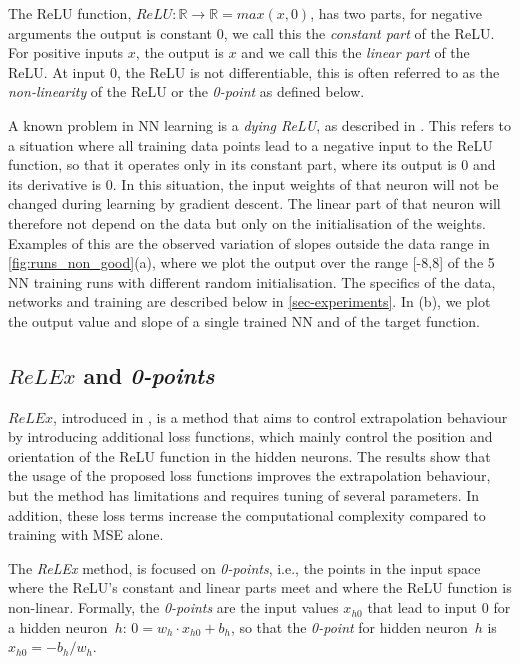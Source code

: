\documentclass[runningheads]{llncs}
\begin{document}
The ReLU function, $ReLU:\mathbb{R}\rightarrow\mathbb{R} = max(x,0)$, has two parts, for negative arguments the output is constant $0$, we call this the \emph{constant part} of the ReLU.
For positive inputs $x$, the output is $x$ and we call this the \emph{linear part} of the ReLU. 
At input $0$, the ReLU is not differentiable, this is often referred to as the \emph{non-linearity} of the ReLU or the \emph{0-point} as defined below. 

A known problem in NN learning is a \emph{dying ReLU}, as described in \cite{douglas2018relu,lu2019dying}. 
This refers to a situation where all training data points lead to a negative input to the ReLU function, so that it operates only in its constant part, where its output is $0$ and its derivative is $0$.
In this situation, the input weights of that neuron will not be changed during learning by gradient descent.
The linear part of that neuron will therefore not depend on the data but only on the initialisation of the weights. 
Examples of this are the observed variation of slopes outside the data range in \autoref{fig:runs_non_good}(a), where we plot the output over the range [-8,8] of the 5 NN training runs with different random initialisation. 
The specifics of the data, networks and training are described below in \autoref{sec-experiments}.
In (b), we plot the output value and slope of a single trained NN and of the target function.

\subsection{$ReLEx$ and \emph{0-points}}

$ReLEx$, introduced in \cite{Lopedoto20}, is a method that aims to control extrapolation behaviour by introducing additional loss functions, which mainly control the position and orientation of the ReLU function in the hidden neurons.
The results show that the usage of the proposed loss functions improves the extrapolation behaviour, but the method has limitations and requires tuning of several parameters. 
In addition, these loss terms increase the computational complexity compared to training with MSE alone. 

The \emph{ReLEx} method, is focused on \emph{0-points}, i.e., the points in the input space where the ReLU's constant and linear parts meet and where the ReLU function is non-linear. 
Formally, the \emph{0-points} are the input values $x_{h0}$ that lead to input $0$ for a hidden neuron~$h$: $0 = w_{h} \cdot x_{h0} + b_{h}$, so that the \emph{0-point} for hidden neuron~$h$ is $x_{h0} = -b_{h}/w_{h}$. 
\end{document}
